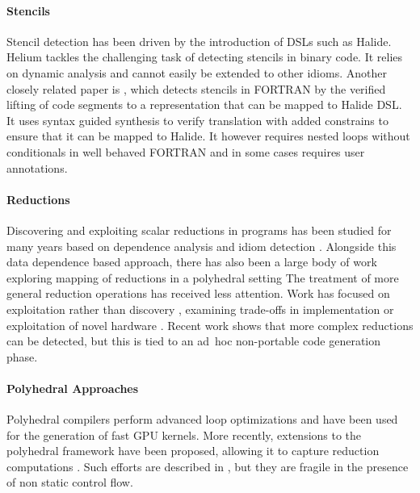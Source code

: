{\paragraph{Stencils}
Stencil detection has been driven by the introduction of DSLs such as
Halide.  Helium \cite{Mendis2015Helium} tackles the challenging task
of detecting stencils in binary code. It relies
on dynamic analysis and cannot easily be extended to
other idioms.
Another closely related paper is \cite{Kamil2016Verified}, which detects stencils in FORTRAN by the
verified lifting of code segments to a representation that can be
mapped to Halide DSL.  It uses syntax guided synthesis to verify
translation with added constrains to ensure that it can be mapped to
Halide.
It however requires nested loops  without conditionals in well behaved FORTRAN
and in some cases requires user annotations.

\paragraph{Reductions}
Discovering and exploiting scalar reductions in programs has been
studied for many years based on dependence analysis and idiom detection
 \cite{fisher1994parallelizing,pottenger1995idiom,suganuma1996detection}.
Alongside this data dependence based approach, there has also been a
 large body of work exploring mapping of reductions in a
 polyhedral setting \cite{jouvelot1989unified,redon1994scheduling}
 The treatment of
more general reduction operations has received  less attention.
Work has focused on exploitation rather than discovery
\cite{Gutierrez:2000,gutierrez2003optimization,gutierrez2008analytical}, examining trade-offs in implementation \cite{yu2006adaptive}
 or exploitation of novel hardware \cite{ravi2010compiler,Huo2011HiPC}.
Recent work \cite{ginsbach2017discovery} shows that more complex reductions can be 
detected, but this is tied to  an  ad~hoc non-portable code generation phase. 

\paragraph{Polyhedral Approaches}
Polyhedral compilers \cite{Baskaran:2010:ACC:2175462.2175482,Verdoolaege:2013:PPC:2400682.2400713} perform advanced loop optimizations and have been used for the generation of fast GPU kernels.
More recently, extensions to the polyhedral framework have been proposed, allowing it to capture reduction computations \cite{chi1997optimizing, gupta2006simplifying, stock2014framework}.
Such efforts are described in \cite{Doerfert2015Polly}, but they are fragile in the presence of non static control flow.

}
